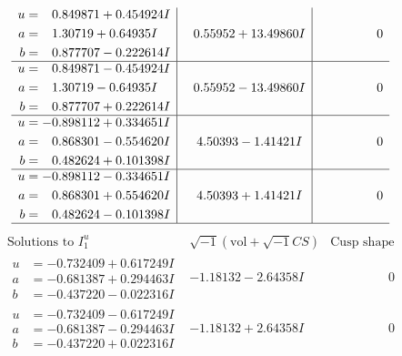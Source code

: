 \documentclass[1p]{elsarticle_modified}
\theoremstyle{definition}
\newcommand{\I}{\sqrt{-1}}
\begin{document}
$$\begin{array}{c|c|c}
\begin{aligned}
u &= \phantom{-}0.849871 + 0.454924 I \\
a &= \phantom{-}1.30719 + 0.64935 I \\
b &= \phantom{-}0.877707 - 0.222614 I\end{aligned}
 & \phantom{-}0.55952 + 13.49860 I & \phantom{-0.000000 } 0 \\ \hline\begin{aligned}
u &= \phantom{-}0.849871 - 0.454924 I \\
a &= \phantom{-}1.30719 - 0.64935 I \\
b &= \phantom{-}0.877707 + 0.222614 I\end{aligned}
 & \phantom{-}0.55952 - 13.49860 I & \phantom{-0.000000 } 0 \\ \hline\begin{aligned}
u &= -0.898112 + 0.334651 I \\
a &= \phantom{-}0.868301 - 0.554620 I \\
b &= \phantom{-}0.482624 + 0.101398 I\end{aligned}
 & \phantom{-}4.50393 - 1.41421 I & \phantom{-0.000000 } 0 \\ \hline\begin{aligned}
u &= -0.898112 - 0.334651 I \\
a &= \phantom{-}0.868301 + 0.554620 I \\
b &= \phantom{-}0.482624 - 0.101398 I\end{aligned}
 & \phantom{-}4.50393 + 1.41421 I & \phantom{-0.000000 } 0\\
 \hline 
 \end{array}$$\newpage$$\begin{array}{c|c|c}  
\text{Solutions to }I^u_{1}& \I (\text{vol} + \sqrt{-1}CS) & \text{Cusp shape}\\
 \hline 
\begin{aligned}
u &= -0.732409 + 0.617249 I \\
a &= -0.681387 + 0.294463 I \\
b &= -0.437220 - 0.022316 I\end{aligned}
 & -1.18132 - 2.64358 I & \phantom{-0.000000 } 0 \\ \hline\begin{aligned}
u &= -0.732409 - 0.617249 I \\
a &= -0.681387 - 0.294463 I \\
b &= -0.437220 + 0.022316 I\end{aligned}
 & -1.18132 + 2.64358 I & \phantom{-0.000000 } 0 \\ \hline\begin{aligned}

\end{aligned}
\end{array}$$
\end{document}
